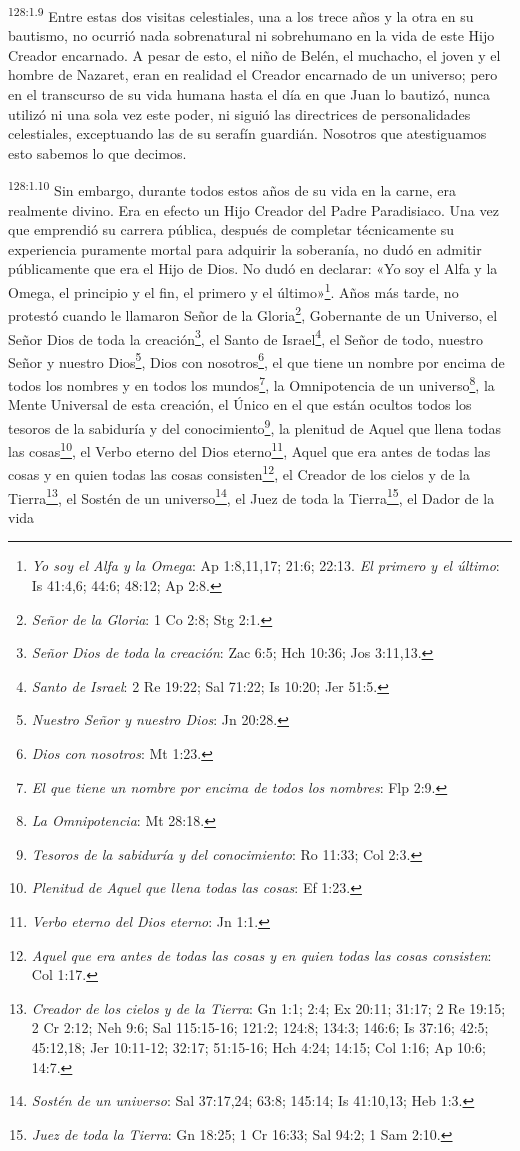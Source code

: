 \par 
\textsuperscript{128:1.9} Entre estas dos visitas celestiales, una a los trece años y la otra en su bautismo, no ocurrió nada sobrenatural ni sobrehumano en la vida de este Hijo Creador encarnado. A pesar de esto, el niño de Belén, el muchacho, el joven y el hombre de Nazaret, eran en realidad el Creador encarnado de un universo; pero en el transcurso de su vida humana hasta el día en que Juan lo bautizó, nunca utilizó ni una sola vez este poder, ni siguió las directrices de personalidades celestiales, exceptuando las de su serafín guardián. Nosotros que atestiguamos esto sabemos lo que decimos.

\par 
\textsuperscript{128:1.10} Sin embargo, durante todos estos años de su vida en la carne, era realmente divino. Era en efecto un Hijo Creador del Padre Paradisiaco. Una vez que emprendió su carrera pública, después de completar técnicamente su experiencia puramente mortal para adquirir la soberanía, no dudó en admitir públicamente que era el Hijo de Dios. No dudó en declarar: «Yo soy el Alfa y la Omega, el principio y el fin, el primero y el último»\footnote{\textit{Yo soy el Alfa y la Omega}: Ap 1:8,11,17; 21:6; 22:13. \textit{El primero y el último}: Is 41:4,6; 44:6; 48:12; Ap 2:8.}. Años más tarde, no protestó cuando le llamaron Señor de la Gloria\footnote{\textit{Señor de la Gloria}: 1 Co 2:8; Stg 2:1.}, Gobernante de un Universo, el Señor Dios de toda la creación\footnote{\textit{Señor Dios de toda la creación}: Zac 6:5; Hch 10:36; Jos 3:11,13.}, el Santo de Israel\footnote{\textit{Santo de Israel}: 2 Re 19:22; Sal 71:22; Is 10:20; Jer 51:5.}, el Señor de todo, nuestro Señor y nuestro Dios\footnote{\textit{Nuestro Señor y nuestro Dios}: Jn 20:28.}, Dios con nosotros\footnote{\textit{Dios con nosotros}: Mt 1:23.}, el que tiene un nombre por encima de todos los nombres y en todos los mundos\footnote{\textit{El que tiene un nombre por encima de todos los nombres}: Flp 2:9.}, la Omnipotencia de un universo\footnote{\textit{La Omnipotencia}: Mt 28:18.}, la Mente Universal de esta creación, el Único en el que están ocultos todos los tesoros de la sabiduría y del conocimiento\footnote{\textit{Tesoros de la sabiduría y del conocimiento}: Ro 11:33; Col 2:3.}, la plenitud de Aquel que llena todas las cosas\footnote{\textit{Plenitud de Aquel que llena todas las cosas}: Ef 1:23.}, el Verbo eterno del Dios eterno\footnote{\textit{Verbo eterno del Dios eterno}: Jn 1:1.}, Aquel que era antes de todas las cosas y en quien todas las cosas consisten\footnote{\textit{Aquel que era antes de todas las cosas y en quien todas las cosas consisten}: Col 1:17.}, el Creador de los cielos y de la Tierra\footnote{\textit{Creador de los cielos y de la Tierra}: Gn 1:1; 2:4; Ex 20:11; 31:17; 2 Re 19:15; 2 Cr 2:12; Neh 9:6; Sal 115:15-16; 121:2; 124:8; 134:3; 146:6; Is 37:16; 42:5; 45:12,18; Jer 10:11-12; 32:17; 51:15-16; Hch 4:24; 14:15; Col 1:16; Ap 10:6; 14:7.}, el Sostén de un universo\footnote{\textit{Sostén de un universo}: Sal 37:17,24; 63:8; 145:14; Is 41:10,13; Heb 1:3.}, el Juez de toda la Tierra\footnote{\textit{Juez de toda la Tierra}: Gn 18:25; 1 Cr 16:33; Sal 94:2; 1 Sam 2:10.}, el Dador de la vida 
